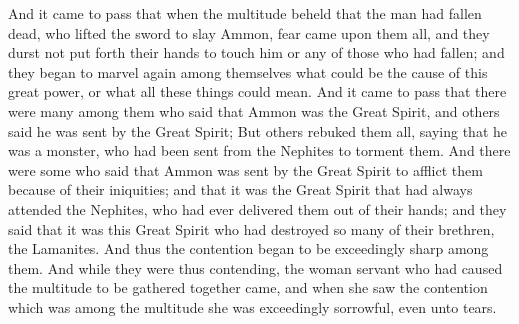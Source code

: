 And it came to pass that when the multitude beheld that the man had fallen dead, who lifted the sword to slay Ammon, fear came upon them all, and they durst not put forth their hands to touch him or any of those who had fallen; and they began to marvel again among themselves what could be the cause of this great power, or what all these things could mean.
\bverse \iffalse And it came to pass that there were many among them who said that Ammon was the Great Spirit, and others said he was sent by the Great Spirit; \fi
And it came to pass that there were many among them who said that Ammon was the Great Spirit, and others said he was sent by the Great Spirit;
\bverse \iffalse But others rebuked them all, saying that he was a monster, who had been sent from the Nephites to torment them. \fi
But others rebuked them all, saying that he was a monster, who had been sent from the Nephites to torment them.
\bverse \iffalse And there were some who said that Ammon was sent by the Great Spirit to afflict them because of their iniquities; and that it was the Great Spirit that had always attended the Nephites, who had ever delivered them out of their hands; and they said that it was this Great Spirit who had destroyed so many of their brethren, the Lamanites. \fi
And there were some who said that Ammon was sent by the Great Spirit to afflict them because of their iniquities; and that it was the Great Spirit that had always attended the Nephites, who had ever delivered them out of their hands; and they said that it was this Great Spirit who had destroyed so many of their brethren, the Lamanites.
\bverse \iffalse And thus the contention began to be exceedingly sharp among them. And while they were thus contending, the woman servant who had caused the multitude to be gathered together came, and when she saw the contention which was among the multitude she was exceedingly sorrowful, even unto tears. \fi
And thus the contention began to be exceedingly sharp among them. And while they were thus contending, the woman servant who had caused the multitude to be gathered together came, and when she saw the contention which was among the multitude she was exceedingly sorrowful, even unto tears.
\bverse \iffalse And it came to pass that she went and took the queen by the hand, that perhaps she might raise her from the ground; and as soon as she touched her hand she arose and stood upon her feet, and cried with a loud voice, saying: O blessed Jesus, who has saved me from an awful hell! O blessed God, have mercy on this people! \fi
